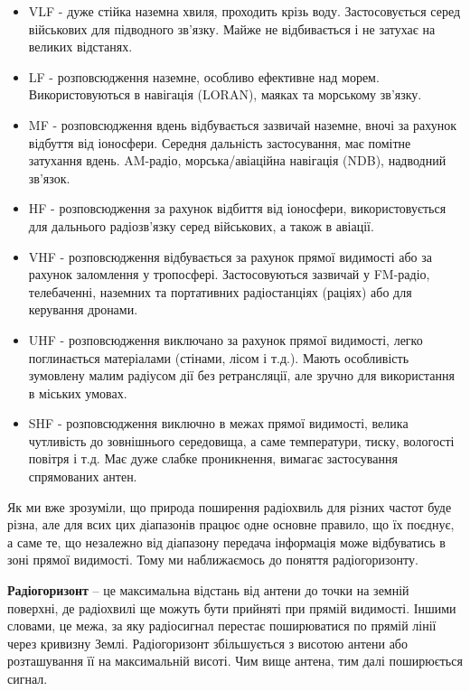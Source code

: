 \documentclass{article}
\begin{document}
\begin{itemize}[noitemsep, topsep=8pt]
	\item VLF - дуже стійка наземна хвиля, проходить крізь воду.  Застосовується серед військових для підводного зв'язку. Майже не відбивається і не затухає на великих відстанях.
	\item LF - розповсюдження наземне, особливо ефективне над морем.
	Використовуються в навігація (LORAN), маяках та морському зв'язку. 
	\item MF - розповсюдження вдень відбувається зазвичай наземне, вночі за рахунок відбуття від іоносфери. Середня дальність застосування, має помітне затухання вдень. AM-радіо, морська/авіаційна навігація (NDB), надводний зв'язок.
	\item HF - розповсюдження за рахунок відбиття від іоносфери, використовується для дальнього радіозв’язку серед військових, а також в авіації.
	\item VHF - розповсюдження відбувається за рахунок прямої видимості або за рахунок заломлення у тропосфері. Застосовуються зазвичай у FM-радіо, телебаченні, 
	наземних та портативних радіостанціях (раціях) або для керування дронами. 
	\item UHF - розповсюдження виключано за рахунок прямої видимості, легко поглинається матеріалами (стінами, лісом і т.д.). Мають особливість зумовлену малим радіусом дії без ретрансляції, але зручно для використання в міських умовах.
	\item SHF - розповсюдження виключно в межах прямої видимості, велика чутливість до зовнішнього середовища, а саме температури, тиску, вологості повітря і т.д. Має дуже слабке проникнення, вимагає застосування спрямованих антен.
\end{itemize}

Як ми вже зрозуміли, що природа поширення радіохвиль для різних частот буде різна, але для всих цих діапазонів працює одне основне правило, що їх поєднує, а саме те, що незалежно від діапазону передача інформація може відбуватись в зоні прямої видимості. Тому ми наближаємось до поняття радіогоризонту.   

\textbf{Радіогоризонт} -- це максимальна відстань від антени до точки на земній поверхні, де радіохвилі ще можуть бути прийняті при прямій видимості. Іншими словами, це межа, за яку радіосигнал перестає поширюватися по прямій лінії через кривизну Землі. Радіогоризонт збільшується з висотою антени або розташування її на максимальній висоті. Чим вище антена, тим далі поширюється сигнал.
\end{document}
